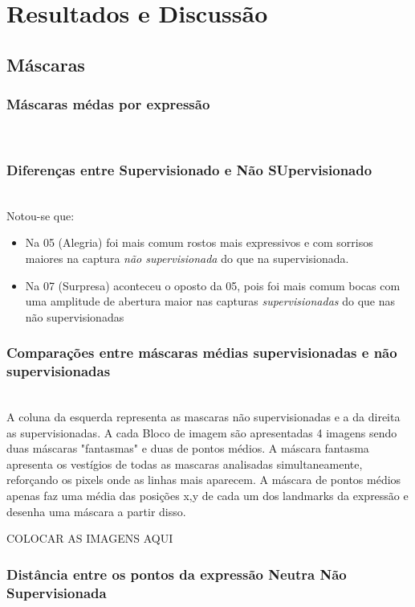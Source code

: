\section{Resultados e Discussão}
\label{sec:resultados}

\subsection{Máscaras}
\subsubsection{Máscaras médas por expressão}\mbox{}\\
\subsubsection{Diferenças entre Supervisionado e Não SUpervisionado}\mbox{}\\
Notou-se que:
\begin{itemize}
    \item Na 05 (Alegria) foi mais comum rostos mais expressivos e com sorrisos maiores na captura \emph{não supervisionada} do que na supervisionada.
    \item Na 07 (Surpresa) aconteceu o oposto da 05, pois foi mais comum bocas com uma amplitude de abertura maior nas capturas \emph{supervisionadas} do que nas não supervisionadas
\end{itemize}

\subsubsection{Comparações entre máscaras médias supervisionadas e não supervisionadas}\mbox{}\\

A coluna da esquerda representa as mascaras não supervisionadas e a da direita as supervisionadas. A cada Bloco de imagem são apresentadas 4 imagens sendo duas máscaras "fantasmas" e duas de pontos médios.
A máscara fantasma apresenta os vestígios de todas as mascaras analisadas simultaneamente, reforçando os pixels onde as linhas mais aparecem.
A máscara de pontos médios apenas faz uma média das posições x,y de cada um dos landmarks da expressão e desenha uma máscara a partir disso.

COLOCAR AS IMAGENS AQUI


\subsubsection{Distância entre os pontos da expressão Neutra Não Supervisionada}\mbox{}\\

